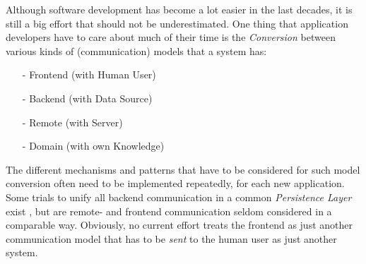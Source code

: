 Although software development has become a lot easier in the last decades, it is
still a big effort that should not be underestimated. One thing that application
developers have to care about much of their time is the \emph{Conversion}
between various kinds of (communication) models that a system has:

\begin{itemize}
    \item[-] Frontend (with Human User)
    \item[-] Backend (with Data Source)
    \item[-] Remote (with Server)
    \item[-] Domain (with own Knowledge)
\end{itemize}

The different mechanisms and patterns that have to be considered for such model
conversion often need to be implemented repeatedly, for each new application.
Some trials to unify all backend communication in a common \emph{Persistence Layer}
exist \cite{ambler}, but are remote- and frontend communication seldom considered
in a comparable way. Obviously, no current effort treats the frontend as just
another communication model that has to be \emph{sent} to the human user as
just another system.
